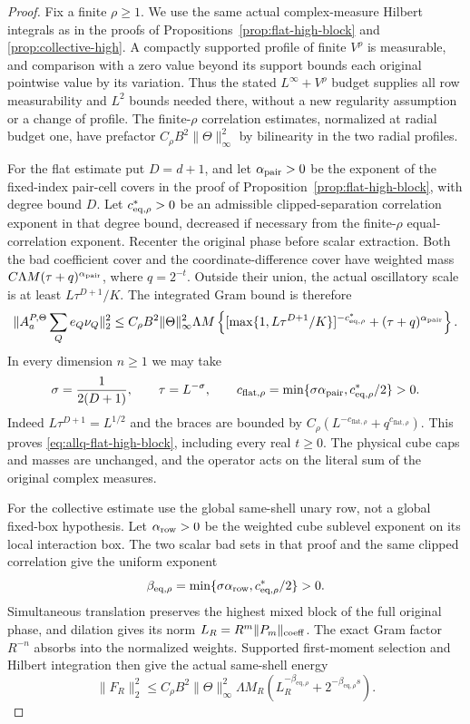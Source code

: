 \documentclass[11pt]{article}
\numberwithin{equation}{section}
\theoremstyle{remark}
\theoremstyle{definition}
\newcommand{\norm}[1]{\lVert #1\rVert}
\begin{document}
\begin{proof}
Fix a finite $\rho\ge1$.  We use the same actual complex-measure
Hilbert integrals as in the proofs of
Propositions~\ref{prop:flat-high-block} and \ref{prop:collective-high}.
A compactly supported profile of finite $V^\rho$ is measurable, and
comparison with a zero value beyond its support bounds each original
pointwise value by its variation.  Thus the stated $L^\infty+V^\rho$
budget supplies all row measurability and $L^2$ bounds needed there,
without a new regularity assumption or a change of profile.
The finite-$\rho$ correlation estimates, normalized at radial budget
one, have prefactor $C_\rho B^2\|\Theta\|_\infty^2$ by bilinearity
in the two radial profiles.

For the flat estimate put $D=d+1$, and let $\alpha_{\rm pair}>0$
be the exponent of the fixed-index pair-cell covers in the
proof of Proposition~\ref{prop:flat-high-block}, with degree bound $D$.
Let $c_{\rm eq,\rho}^*>0$ be an admissible clipped-separation correlation
exponent in that degree bound, decreased if necessary from the
finite-$\rho$ equal-correlation exponent.  Recenter the original phase
before scalar extraction.  Both the bad coefficient cover and the
coordinate-difference cover have weighted mass
$C\Lambda M(\tau+q)^{\alpha_{\rm pair}}$, where $q=2^{-t}$.
Outside their union, the actual oscillatory scale is at least
$L\tau^{D+1}/K$.  The integrated Gram bound is therefore
\[
 \|A^{P,\Theta}_a\sum_Qe_Q\nu_Q\|_2^2
 \le C_\rho B^2\|\Theta\|_\infty^2\Lambda M
 \left\{[\max\{1,L\tau^{D+1}/K\}]^{-c_{\rm eq,\rho}^*}
                 +(\tau+q)^{\alpha_{\rm pair}}\right\}.
\]
In every dimension $n\ge1$ we may take
\begin{equation}\label{eq:allq-flat-explicit-choice}
 \sigma=\frac1{2(D+1)},\qquad \tau=L^{-\sigma},\qquad
 c_{\mathrm{flat},\rho}
 =\min\{\sigma\alpha_{\rm pair},c_{\rm eq,\rho}^*/2\}>0.
\end{equation}
Indeed $L\tau^{D+1}=L^{1/2}$ and the braces are bounded by
$C_\rho(L^{-c_{\mathrm{flat},\rho}}+q^{c_{\mathrm{flat},\rho}})$.
This proves \eqref{eq:allq-flat-high-block}, including every real
$t\ge0$.  The physical cube caps and masses are unchanged, and the
operator acts on the literal sum of the original complex measures.

For the collective estimate use the global same-shell unary row,
not a global fixed-box hypothesis.  Let $\alpha_{\rm row}>0$ be the
weighted cube sublevel exponent on its local interaction box.
The two scalar bad sets in that proof and the same clipped correlation
give the uniform exponent
\[
 \beta_{\mathrm{eq},\rho}
 =\min\{\sigma\alpha_{\rm row},c_{\rm eq,\rho}^*/2\}>0.
\]
Simultaneous translation preserves the highest mixed block of the
full original phase, and dilation gives its norm
$L_R=R^m\norm{P_m}_{\rm coeff}$.  The exact Gram factor $R^{-n}$
absorbs into the normalized weights.  Supported first-moment selection
and Hilbert integration then give the actual same-shell energy
\[
 \|F_R\|_2^2\le
 C_\rho B^2\|\Theta\|_\infty^2\Lambda M_R
       (L_R^{-\beta_{\mathrm{eq},\rho}}
                         +2^{-\beta_{\mathrm{eq},\rho}s}).
\]


\end{proof}
\end{document}
